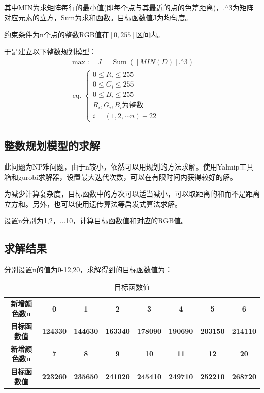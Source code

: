 \documentclass{article}
\begin{document}
  其中MIN为求矩阵每行的最小值(即每个点与其最近的点的色差距离)，$.^{\wedge} 3$为矩阵对应元素的立方，Sum为求和函数。目标函数值J为均匀度。
  
  约束条件为n个点的整数RGB值在$[0,255]$区间内。
  
  于是建立以下整数规划模型：
  \begin{equation}
  \begin{array}{l}
  \max :\quad J = \operatorname{Sum}\left([MIN(D)].^{\wedge} 3\right) \\
  \text { eq. }\left\{\begin{array}{rl}
  0 \leq R_{i} \leq 255 \\
  0 \leq G_{i} \leq 255 \\
  0 \leq B_{i} \leq 255 \\
  R_{i},G_{i},B_{i} \text{为整数}\\
  i=(1,2, \cdots n)+22
  \end{array}\right.
  \end{array}
  \end{equation}
 \subsection{整数规划模型的求解}
 此问题为NP难问题，由于n较小，依然可以用规划的方法求解。使用Yalmip工具箱和gurobi求解器，设置最大迭代次数，可以在有限时间内获得较好的解。
 
 为减少计算复杂度，目标函数中的方次可以适当减小，可以取距离的和而不是距离立方和。另外，也可以使用遗传算法等启发式算法求解。
 
 设置n分别为1,2，...10，计算目标函数值和对应的RGB值。
 \subsection{求解结果}
 分别设置n的值为0-12,20，求解得到的目标函数值为：
\begin{table}[htbp]
	\centering
	\caption{目标函数值}
	\begin{tabular}{cccccccc}
		\toprule
		\textbf{新增颜色数n} & \textbf{0} & \textbf{1} & \textbf{2} & \textbf{3} & \textbf{4} & \textbf{5} & \textbf{6} \\
		\textbf{目标函数值} & \textbf{124330 } & \textbf{144630 } & \textbf{163340 } & \textbf{178090 } & \textbf{190690 } & \textbf{203150 } & \textbf{214110 } \\
		\midrule
		\textbf{新增颜色数n} & \textbf{7} & \textbf{8} & \textbf{9} & \textbf{10} & \textbf{11} & \textbf{12} & \textbf{20} \\
		\textbf{目标函数值} & \textbf{223260 } & \textbf{235650 } & \textbf{241020 } & \textbf{245410 } & \textbf{249710 } & \textbf{252210 } & \textbf{268720 } \\
		\bottomrule
	\end{tabular}%
	\label{mubiaozhi}%
\end{table}%
\end{document}
